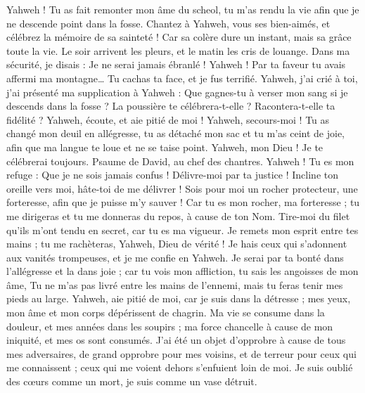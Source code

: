 \begin{multicols}{2}
Yahweh ! Tu as fait remonter mon âme du scheol, tu m'as rendu la vie afin que je ne descende point dans la fosse.
Chantez à Yahweh, vous ses bien-aimés, et célébrez la mémoire de sa sainteté !
Car sa colère dure un instant, mais sa grâce toute la vie. Le soir arrivent les pleurs, et le matin les cris de louange.
Dans ma sécurité, je disais : Je ne serai jamais ébranlé !
Yahweh ! Par ta faveur tu avais affermi ma montagne… Tu cachas ta face, et je fus terrifié.
Yahweh, j'ai crié à toi, j'ai présenté ma supplication à Yahweh :
Que gagnes-tu à verser mon sang si je descends dans la fosse ? La poussière te célébrera-t-elle ? Racontera-t-elle ta fidélité ?
Yahweh, écoute, et aie pitié de moi ! Yahweh, secours-moi !
Tu as changé mon deuil en allégresse, tu as détaché mon sac et tu m'as ceint de joie,
afin que ma langue te loue et ne se taise point. Yahweh, mon Dieu ! Je te célébrerai toujours.
\VerseOne{}Psaume de David, au chef des chantres.
Yahweh ! Tu es mon refuge : Que je ne sois jamais confus ! Délivre-moi par ta justice !
Incline ton oreille vers moi, hâte-toi de me délivrer ! Sois pour moi un rocher protecteur, une forteresse, afin que je puisse m'y sauver !
Car tu es mon rocher, ma forteresse ; tu me dirigeras et tu me donneras du repos, à cause de ton Nom.
Tire-moi du filet qu'ils m'ont tendu en secret, car tu es ma vigueur.
Je remets mon esprit entre tes mains ; tu me rachèteras, Yahweh, Dieu de vérité !
Je hais ceux qui s'adonnent aux vanités trompeuses, et je me confie en Yahweh.
Je serai par ta bonté dans l'allégresse et la dans joie ; car tu vois mon affliction, tu sais les angoisses de mon âme,
Tu ne m'as pas livré entre les mains de l'ennemi, mais tu feras tenir mes pieds au large.
Yahweh, aie pitié de moi, car je suis dans la détresse ; mes yeux, mon âme et mon corps dépérissent de chagrin.
Ma vie se consume dans la douleur, et mes années dans les soupirs ; ma force chancelle à cause de mon iniquité, et mes os sont consumés.
J'ai été un objet d'opprobre à cause de tous mes adversaires, de grand opprobre pour mes voisins, et de terreur pour ceux qui me connaissent ; ceux qui me voient dehors s'enfuient loin de moi.
Je suis oublié des cœurs comme un mort, je suis comme un vase détruit.

\end{multicols}
